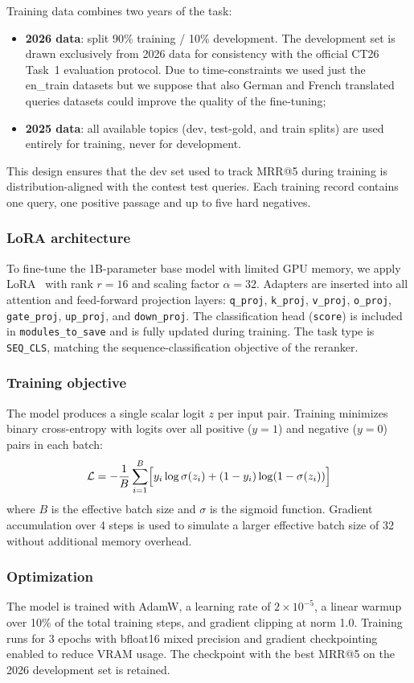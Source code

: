 Training data combines two years of the task:
\begin{itemize}
  \item \textbf{2026 data}: split 90\% training / 10\% development. The development set is drawn exclusively from 2026 data for consistency with the official CT26 Task~1 evaluation protocol. Due to time-constraints we used just the en\_train datasets but we suppose that also German and French translated queries datasets could improve the quality of the fine-tuning;
  \item \textbf{2025 data}: all available topics (dev, test-gold, and train splits) are used entirely for training, never for development.
\end{itemize}
This design ensures that the dev set used to track MRR@5 during training is distribution-aligned with the contest test queries. Each training record contains one query, one positive passage and up to five hard negatives.

\subsubsection*{LoRA architecture}
To fine-tune the 1B-parameter base model with limited GPU memory, we apply LoRA~\cite{hu2022lora} with rank $r = 16$ and scaling factor $\alpha = 32$. Adapters are inserted into all attention and feed-forward projection layers:
\texttt{q\_proj}, \texttt{k\_proj}, \texttt{v\_proj}, \texttt{o\_proj}, \texttt{gate\_proj}, \texttt{up\_proj}, and \texttt{down\_proj}.
The classification head (\texttt{score}) is included in
\texttt{modules\_to\_save} and is fully updated during training. The task type is \texttt{SEQ\_CLS}, matching the sequence-classification objective of the reranker.

\subsubsection*{Training objective}
The model produces a single scalar logit $z$ per input pair.
Training minimizes binary cross-entropy with logits over all
positive ($y=1$) and negative ($y=0$) pairs in each batch:
\[
  \mathcal{L} = -\frac{1}{B}\sum_{i=1}^{B}
    \Bigl[ y_i \log \sigma(z_i) + (1 - y_i)\log(1 - \sigma(z_i)) \Bigr]
\]
where $B$ is the effective batch size and $\sigma$ is the sigmoid function. Gradient accumulation over 4 steps is used to simulate a larger effective batch size of 32 without additional memory overhead.

\subsubsection*{Optimization}
The model is trained with AdamW, a learning rate of $2 \times 10^{-5}$, a linear warmup over 10\% of the total training steps, and gradient clipping at norm 1.0. Training runs for 3 epochs with bfloat16 mixed precision and gradient checkpointing enabled to reduce VRAM usage. The checkpoint with the best MRR@5 on the 2026 development set is retained.

